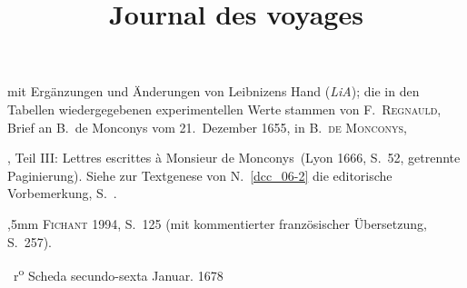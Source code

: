 \begin{ledgroupsized}[r]{114mm}
mit Ergänzungen und Änderungen von Leibnizens Hand (\textit{LiA});
die in den Tabellen wiedergegebenen experimentellen Werte stammen von
\protect{}%
\textsc{F.~Regnauld},
\cite{02021}Brief an B.~de Monconys vom 21.~Dezember 1655,
in
\protect{}%
\textsc{B.~de Monconys,}
\cite{00118}\title{Journal des voyages},
Teil III: \glqq Lettres escrittes à Monsieur de Monconys\grqq\
(Lyon 1666, S.~52, getrennte Paginierung).
Siehe zur Textgenese von N.~\ref{dcc_06-2} %
die editorische Vorbemerkung, S.~.
\pend%
\end{ledgroupsized}%
%
\begin{ledgroupsized}[r]{114mm}
\footnotesize 
\pstart%
,5mm
%
\textsc{Fichant} 1994, S.~125\cite{01056}
(mit kommentierter französischer Übersetzung, S.~257).
\pend
\end{ledgroupsized}
%
%
\frenchspacing%
%
%
\count{}%
\count{}%
\count{}
%
\vspace{8mm}%
\normalsize%
\pstart%
\noindent%
%
~r\textsuperscript{o}\rbrack%
\hspace{40mm}
Scheda secundo-sexta%
\protect{}%
%
\hspace{30mm}
Januar. 1678
\pend%
\vspace{0.5em}%

